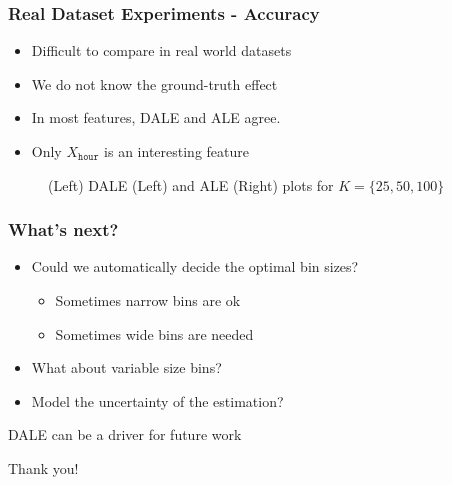 \begin{frame}
  \frametitle{Real Dataset Experiments - Accuracy}
  \begin{itemize}
  \item Difficult to compare in real world datasets
  \item We do not know the ground-truth effect
  \item In most features, DALE and ALE agree.
  \item Only \(X_{\mathtt{hour}}\) is an interesting feature
  \end{itemize}

  \begin{figure}[h]
    \centering
    \resizebox{.3\columnwidth}{!}{}
    \resizebox{.3\columnwidth}{!}{}
    \caption{(Left) DALE (Left) and ALE (Right) plots for
      \(K = \{25, 50, 100\}\)}
  \end{figure}

\end{frame}

\begin{frame}
  \frametitle{What's next?}
  \begin{itemize}
  \item Could we automatically decide the optimal bin sizes?
    \begin{itemize}
    \item Sometimes narrow bins are ok
    \item Sometimes wide bins are needed
    \end{itemize}
  \item What about variable size bins?
  \item Model the uncertainty of the estimation?
  \end{itemize}

  DALE can be a driver for future work
\end{frame}


\begin{frame}[plain,c]
  \Large Thank you!
\end{frame}


